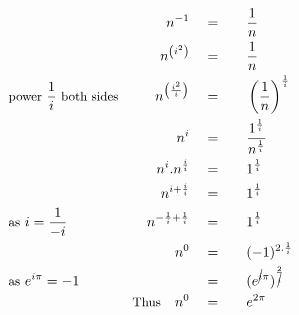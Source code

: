 \begin{alignat*}{5}
&\,&n^{-1}\quad&=\quad&&\frac{1}{n}\\
&\,&n^{\left(i^2\right)}\quad&=&&\frac{1}{n}\\
&\small\text{power }\normalsize\frac{1}{i}\small\text{ both sides}&n^{\left(\frac{i^2}{i}\right)}\quad&=&&\left(\frac{1}{n}\right)^\frac{1}{i}\\
&\,&n^i\quad&=&&\frac{1^\frac{1}{i}}{n^\frac{1}{i}}\\
&\,&n^i.n^\frac{i}{i}\quad&=&&1^\frac{1}{i}\\
&\,&n^{i+\frac{i}{i}}\quad&=&&1^\frac{1}{i}\\
&\small\text{as}\normalsize~i=\frac{1}{-i}&n^{-\frac{1}{i}+\frac{1}{i}}\quad&=&&1^\frac{1}{i}\\
&\,&n^0\quad&=&&(-1)^{2.\frac{1}{i}}\\
&\small\text{as}\normalsize~e^{i\pi}=-1&\,&=&&(e^{\cancel{i}\pi})^\frac{2}{\cancel{i}}\\
&\,&\small\text{Thus}\normalsize\quad n^0\quad&=&&e^{2\pi}\\
\end{alignat*}
